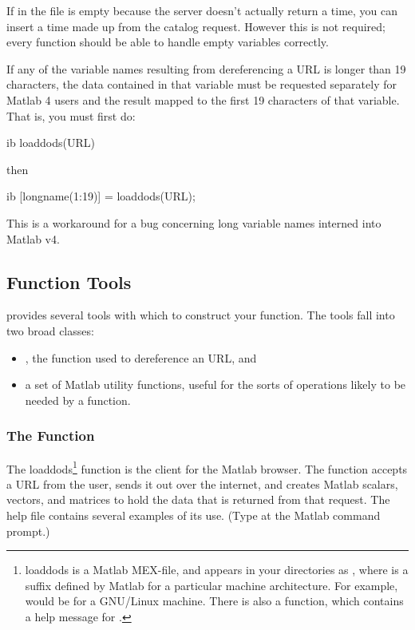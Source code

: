   If  in the  file is empty because
  the server doesn't actually return a time, you can insert a time
  made up from the catalog request.  However this is not required;
  every  function should be able to handle empty variables
  correctly.

  If any of the variable names resulting from dereferencing a URL is
  longer than 19 characters, the data contained in that variable must
  be requested separately for Matlab 4 users and the result mapped to
  the first 19 characters of that variable.  That is, you must first
  do:

\begin{vcode}{ib}
loaddods(URL)
\end{vcode}

then

\begin{vcode}{ib}
[longname(1:19)] = loaddods(URL);
\end{vcode}

This is a workaround for a bug concerning long variable names interned
into Matlab v4.

\subsection{ Function Tools}
\label{gui,adding,tools}

\opendap provides several tools with which to construct your 
function.  The tools fall into two broad classes: 

\begin{itemize}
\item {}, the function used to dereference an \opendap URL, and

\item a set of Matlab utility functions, useful for the sorts of
operations likely to be needed by a  function.

\end{itemize}

\subsubsection{The  Function}

The loaddods\footnote{loaddods is a Matlab MEX-file, and appears in
your directories as , where  is a
suffix defined by Matlab for a particular machine architecture.  For
example,  would be for a GNU/Linux machine.  There is
also a  function, which contains a help message for
.} function is the \opendap client for the Matlab browser.
The function accepts a URL from the user, sends it out over the
internet, and creates Matlab scalars, vectors, and matrices to hold
the data that is returned from that request.  The 
help file contains several examples of its use. (Type 
at the Matlab command prompt.)


